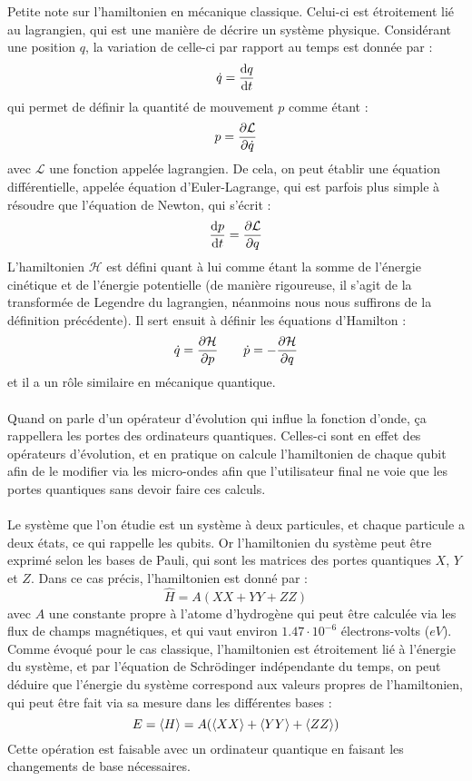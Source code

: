 Petite note sur l'hamiltonien en mécanique classique.
Celui-ci est étroitement lié au lagrangien, qui est une manière de décrire un système
physique.
Considérant une position $q$, la variation de celle-ci par rapport au temps est donnée
par :
\[
    \dot{q} = \dv{q}{t}
\]
qui permet de définir la quantité de mouvement $p$ comme étant :
\[
    p = \pdv{\mathcal{L}}{\dot{q}}
\]
avec $\mathcal{L}$ une fonction appelée lagrangien.
De cela, on peut établir une équation différentielle, appelée équation d'Euler-Lagrange,
qui est parfois plus simple à résoudre que l'équation de Newton, qui s'écrit :
\[
    \dv{p}{t} = \pdv{\mathcal{L}}{q}
\]
L'hamiltonien $\mathcal{H}$ est défini quant à lui comme étant la somme de l'énergie cinétique et
de l'énergie potentielle (de manière rigoureuse, il s'agit de la transformée de Legendre
du lagrangien, néanmoins nous nous suffirons de la définition précédente).
Il sert ensuit à définir les équations d'Hamilton :
\[
    \dot{q} = \pdv{\mathcal{H}}{p} \qquad \dot{p} = - \pdv{\mathcal{H}}{q}
\]
et il a un rôle similaire en mécanique quantique.\\ \\
Quand on parle d'un opérateur d'évolution qui influe la fonction d'onde, ça rappellera les
portes des ordinateurs quantiques.
Celles-ci sont en effet des opérateurs d'évolution, et en pratique on calcule l'hamiltonien
de chaque qubit afin de le modifier via les micro-ondes afin que l'utilisateur final ne voie
que les portes quantiques sans devoir faire ces calculs.\\ \\
Le système que l'on étudie est un système à deux particules, et chaque particule a deux états,
ce qui rappelle les qubits.
Or l'hamiltonien du système peut être exprimé selon les bases de Pauli, qui sont les matrices
des portes quantiques $X$, $Y$ et $Z$.
Dans ce cas précis, l'hamiltonien est donné par :
\[
    \hat{H} = A (XX + YY + ZZ)
\]
avec $A$ une constante propre à l'atome d'hydrogène qui peut être calculée via les flux de champs
magnétiques, et qui vaut environ $1.47 \cdot 10^{-6}$ électrons-volts ($eV$).
Comme évoqué pour le cas classique, l'hamiltonien est étroitement lié à l'énergie du système,
et par l'équation de Schrödinger indépendante du temps, on peut déduire que l'énergie du système
correspond aux valeurs propres de l'hamiltonien, qui peut être fait via sa mesure dans les
différentes bases :
\[
    E = \expval{H} = A (\expval{XX} + \expval{YY} + \expval{ZZ})
\]
Cette opération est faisable avec un ordinateur quantique en faisant les changements de base nécessaires.
